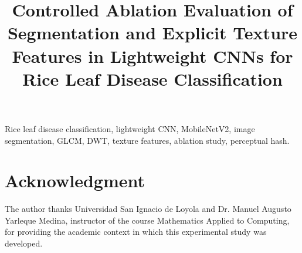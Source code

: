 \documentclass[conference]{IEEEtran}
\begin{document}
\title{Controlled Ablation Evaluation of Segmentation and Explicit Texture Features in Lightweight CNNs for Rice Leaf Disease Classification}

\author{%
}

\maketitle

\begin{abstract}

\end{abstract}

\begin{IEEEkeywords} Rice leaf disease classification, lightweight CNN, MobileNetV2, image segmentation, GLCM, DWT, texture features, ablation study, perceptual hash. \end{IEEEkeywords}










\section*{Acknowledgment}

The author thanks Universidad San Ignacio de Loyola and Dr. Manuel Augusto Yarleque Medina, instructor of the course Mathematics Applied to Computing, for providing the academic context in which this experimental study was developed.

\balance


\end{document}
